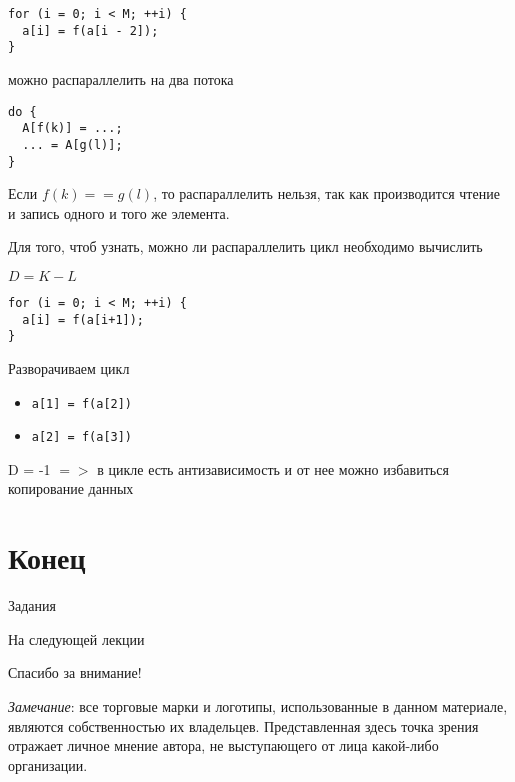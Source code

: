 \begin{frame}[fragile]

\begin{lstlisting}
for (i = 0; i < M; ++i) {
  a[i] = f(a[i - 2]);
}
\end{lstlisting}

можно распараллелить на два потока

\end{frame}

\begin{frame}[fragile]

\begin{lstlisting}
do {
  A[f(k)] = ...;
  ... = A[g(l)];
}
\end{lstlisting}

Если $f(k) == g(l)$, то распараллелить нельзя, так как производится чтение и запись одного и того же элемента.

\end{frame}

\begin{frame}[fragile]

Для того, чтоб узнать, можно ли распараллелить цикл необходимо вычислить

$D = K - L$

\begin{lstlisting}
for (i = 0; i < M; ++i) {
  a[i] = f(a[i+1]);
}
\end{lstlisting}

Разворачиваем цикл

\begin{itemize}
  \item \texttt{a[1] = f(a[2])}
  \item \texttt{a[2] = f(a[3])}
\end{itemize}

D = -1 $=>$ в цикле есть антизависимость и от нее можно избавиться копирование данных

\end{frame}

\section*{Конец}

\begin{frame}{Задания}
\end{frame}

\begin{frame}{На следующей лекции}
\end{frame}

\begin{frame}

{\huge{Спасибо за внимание!}\par}

\vfill

\tiny{\textit{Замечание}: все торговые марки и логотипы, использованные в данном материале, являются собственностью их владельцев. Представленная здесь точка зрения отражает личное мнение автора, не выступающего от лица какой-либо организации.}

\end{frame}


